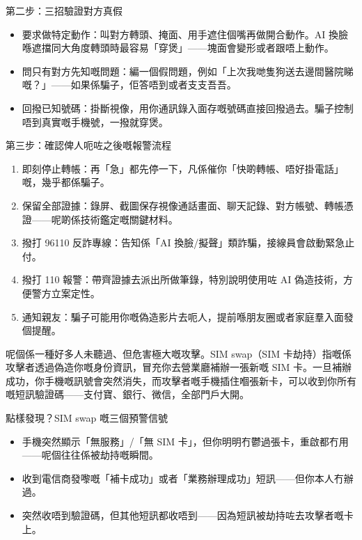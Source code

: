 \begin{tcbinfo}{第二步：三招驗證對方真假}
\begin{itemize}
  \item 要求做特定動作：叫對方轉頭、掩面、用手遮住個嘴再做開合動作。AI 換臉喺遮擋同大角度轉頭時最容易「穿煲」——塊面會變形或者跟唔上動作。
  \item 問只有對方先知嘅問題：編一個假問題，例如「上次我哋隻狗送去邊間醫院睇嘅？」——如果係騙子，佢答唔到或者支支吾吾。
  \item 回撥已知號碼：掛斷視像，用你通訊錄入面存嘅號碼直接回撥過去。騙子控制唔到真實嘅手機號，一撥就穿煲。
\end{itemize}

\end{tcbinfo}

\begin{tcbwarn}{第三步：確認俾人呃咗之後嘅報警流程}
\begin{enumerate}
  \item 即刻停止轉帳：再「急」都先停一下，凡係催你「快啲轉帳、唔好掛電話」嘅，幾乎都係騙子。
  \item 保留全部證據：錄屏、截圖保存視像通話畫面、聊天記錄、對方帳號、轉帳憑證——呢啲係技術鑑定嘅關鍵材料。
  \item 撥打 96110 反詐專線：告知係「AI 換臉/擬聲」類詐騙，接線員會啟動緊急止付。
  \item 撥打 110 報警：帶齊證據去派出所做筆錄，特別說明使用咗 AI 偽造技術，方便警方立案定性。
  \item 通知親友：騙子可能用你嘅偽造影片去呃人，提前喺朋友圈或者家庭羣入面發個提醒。
\end{enumerate}

\end{tcbwarn}


呢個係一種好多人未聽過、但危害極大嘅攻擊。SIM swap（SIM 卡劫持）指嘅係攻擊者透過偽造你嘅身份資訊，冒充你去營業廳補辦一張新嘅 SIM 卡。一旦補辦成功，你手機嘅訊號會突然消失，而攻擊者嘅手機插住嗰張新卡，可以收到你所有嘅短訊驗證碼——支付寶、銀行、微信，全部門戶大開。

\begin{tcbinfo}{點樣發現？SIM swap 嘅三個預警信號}
\begin{itemize}
  \item 手機突然顯示「無服務」/「無 SIM 卡」，但你明明冇鬱過張卡，重啟都冇用——呢個往往係被劫持嘅瞬間。
  \item 收到電信商發嚟嘅「補卡成功」或者「業務辦理成功」短訊——但你本人冇辦過。
  \item 突然收唔到驗證碼，但其他短訊都收唔到——因為短訊被劫持咗去攻擊者嘅卡上。
\end{itemize}

\end{tcbinfo}

